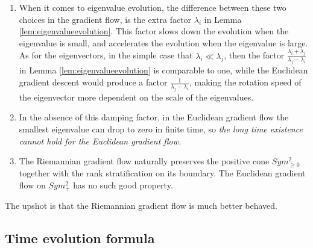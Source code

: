 \documentclass[a4paper]{article}
\theoremstyle{definition}
\newcommand{\1}{\mathbbm{1}}
\begin{document}
	\begin{enumerate}
		\item 
		When it comes to eigenvalue evolution, the difference between these two choices in the gradient flow, is the extra factor $\lambda_i$ in Lemma \ref{lem:eigenvalueevolution}. This factor slows down the evolution when the eigenvalue is small, and accelerates the evolution when the eigenvalue is large. 
		As for the eigenvectors, in the simple case that $\lambda_i\ll \lambda_j$, then the factor $\frac{\lambda_i+\lambda_j}{\lambda_j-\lambda_i}$ in Lemma \ref{lem:eigenvalueevolution} is comparable to one, while the Euclidean gradient descent would produce a factor $ \frac{1}{\lambda_j-\lambda_i} $, making the rotation speed of the eigenvector more dependent on the scale of the eigenvalues.
		
		
		\item  In the absence of this damping factor, in the Euclidean gradient flow the smallest eigenvalue can drop to zero in finite time, so \emph{the long time existence cannot hold for the Euclidean gradient flow.}
		
		
		
		\item The Riemannian gradient flow naturally preserves the positive cone $Sym^2_{\geq 0}$ together with the rank stratification on its boundary. The Euclidean gradient flow on $Sym^2_+$ has no such good property.
		
		
		
		
		
	\end{enumerate}
	
	
	
	The upshot is that the Riemannian gradient flow is much better behaved.
	
	
	\subsection{Time evolution formula}
	
	
	
	
	
	
	
	
	
\end{document}
